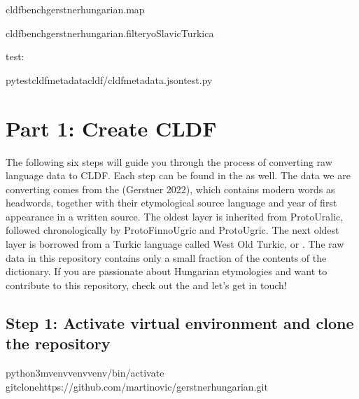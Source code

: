 \documentclass[letterpaper,10pt,english]{sphinxmanual}
\begin{document}
\begin{sphinxVerbatim}[commandchars=\\\{\}]
cldfbenchgerstnerhungarian.map

cldfbenchgerstnerhungarian.filter\PYGZhy{}y\PYGZhy{}oSlavicTurkic\PYGZhy{}a
\end{sphinxVerbatim}

\sphinxAtStartPar
test:

\begin{sphinxVerbatim}[commandchars=\\\{\}]
pytest\PYGZhy{}\PYGZhy{}cldf\PYGZhy{}metadatacldf/cldf\PYGZhy{}metadata.jsontest.py
\end{sphinxVerbatim}

\sphinxstepscope


\chapter{Part 1: Create CLDF}
\label{\detokenize{mkcldf:part-1-create-cldf}}\label{\detokenize{mkcldf::doc}}
\sphinxAtStartPar
The following six steps will guide you through the process of
converting raw language data to CLDF. Each step can be found in the
as well. The data we are converting comes from
the  (Gerstner 2022),
which contains modern  words as headwords,
together with their
etymological source language and year of first appearance in a written source.
The oldest layer is inherited from Proto\sphinxhyphen{}Uralic, followed chronologically by
Proto\sphinxhyphen{}Finno\sphinxhyphen{}Ugric and
Proto\sphinxhyphen{}Ugric. The next oldest layer is borrowed from a Turkic language called
West Old Turkic, or . The raw data in this
repository contains
only a small fraction of the contents of the dictionary.
If you are passionate about Hungarian etymologies and want to contribute
to this repository, check out the 
and let’s get in touch!


\section{Step 1: Activate virtual environment and clone the repository}
\label{\detokenize{mkcldf:step-1-activate-virtual-environment-and-clone-the-repository}}
\begin{sphinxVerbatim}[commandchars=\\\{\}]
python3\PYGZhy{}mvenvvenvvenv/bin/activate
gitclonehttps://github.com/martino\PYGZhy{}vic/gerstnerhungarian.git
\end{sphinxVerbatim}
\end{document}
